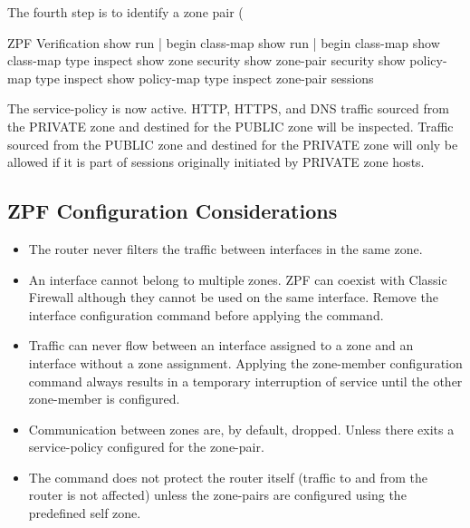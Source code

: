 The fourth step is to identify a zone pair (\\

\begin{sexylisting}{ZPF Verification}
show run | begin class-map
show run | begin class-map
show class-map type inspect
show zone security
show zone-pair security
show policy-map type inspect
show policy-map type inspect zone-pair sessions
\end{sexylisting}

The service-policy is now active. HTTP, HTTPS, and DNS traffic sourced from the PRIVATE zone and destined for the PUBLIC zone will be inspected. Traffic sourced from the PUBLIC zone and destined for the PRIVATE zone will only be allowed if it is part of sessions originally initiated by PRIVATE zone hosts.

\subsection{ZPF Configuration Considerations}

\begin{itemize}
\item The router never filters the traffic between interfaces in the same zone.
\item An interface cannot belong to multiple zones.
ZPF can coexist with Classic Firewall although they cannot be used on the same interface. Remove the  interface configuration command before applying the  command.
\item Traffic can never flow between an interface assigned to a zone and an interface without a zone assignment. Applying the zone-member configuration command always results in a temporary interruption of service until the other zone-member is configured.
\item Communication between zones are, by default, dropped. Unless there exits a service-policy configured for the zone-pair.
\item The  command does not protect the router itself (traffic to and from the router is not affected) unless the zone-pairs are configured using the predefined self zone.
\end{itemize}